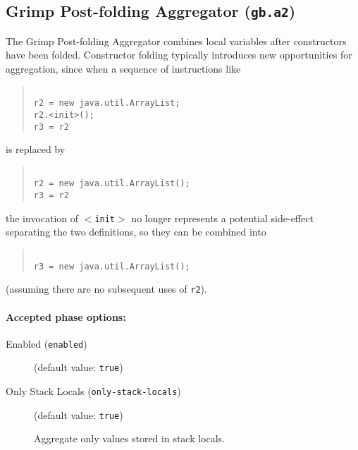 \documentclass{article}
\begin{document}
\subsection{Grimp Post-folding Aggregator ({\tt gb.a2})}

The Grimp Post-folding Aggregator combines local variables after
constructors have been folded. Constructor folding typically
introduces new opportunities for aggregation, since when a
sequence of instructions like

\begin{quote}\begin{verbatim}

r2 = new java.util.ArrayList;
r2.<init>();
r3 = r2

\end{verbatim}\end{quote}
is replaced by

\begin{quote}\begin{verbatim}

r2 = new java.util.ArrayList();
r3 = r2

\end{verbatim}\end{quote}
the invocation of {\tt \ensuremath{<}init\ensuremath{>}} no longer represents a potential side-effect 
separating the two definitions, so they can be combined into

\begin{quote}\begin{verbatim}

r3 = new java.util.ArrayList();

\end{verbatim}\end{quote}
(assuming there are no subsequent uses of {\tt r2}).


\paragraph{Accepted phase options:} 

\begin{description}

\item[Enabled ({\tt enabled})]
(default value: {\tt true})






\item[Only Stack Locals ({\tt only-stack-locals})]
(default value: {\tt true})




Aggregate only values stored in stack locals.



\end{description}
\end{document}
